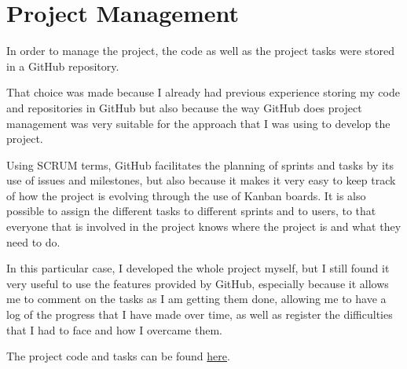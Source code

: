 \chapter{Project Management}
In order to manage the project, the code as well as the project tasks were stored in a GitHub repository.

That choice was made because I already had previous experience storing my code and repositories in GitHub but also because the way GitHub does project management was very suitable for the approach that I was using to develop the project.

Using SCRUM terms, GitHub facilitates the planning of sprints and tasks by its use of issues and milestones, but also because it makes it very easy to keep track of how the project is evolving through the use of Kanban boards. It is also possible to assign the different tasks to different sprints and to users, to that everyone that is involved in the project knows where the project is and what they need to do.

In this particular case, I developed the whole project myself, but I still found it very useful to use the features provided by GitHub, especially because it allows me to comment on the tasks as I am getting them done, allowing me to have a log of the progress that I have made over time, as well as register the difficulties that I had to face and how I overcame them.

The project code and tasks can be found \href{https://github.com/alexcosta97/crypto-predictions/}{here}.